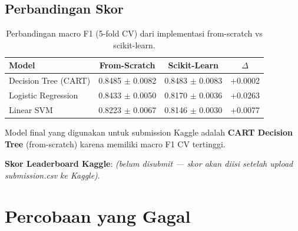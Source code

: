 \documentclass[12pt,a4paper]{article}
\begin{document}
\subsection{Perbandingan Skor}

\begin{table}[H]
\centering
\caption{Perbandingan macro F1 (5-fold CV) dari implementasi from-scratch vs scikit-learn.}
\label{tab:comparison}
\renewcommand{\arraystretch}{1.3}
\begin{tabular}{lccc}
\toprule
\textbf{Model} & \textbf{From-Scratch} & \textbf{Scikit-Learn} & \textbf{$\Delta$} \\
\midrule
Decision Tree (CART) & 0.8485 $\pm$ 0.0082 & 0.8483 $\pm$ 0.0083 & +0.0002 \\
Logistic Regression  & 0.8433 $\pm$ 0.0050 & 0.8170 $\pm$ 0.0036 & +0.0263 \\
Linear SVM           & 0.8223 $\pm$ 0.0067 & 0.8146 $\pm$ 0.0030 & +0.0077 \\
\bottomrule
\end{tabular}
\end{table}

Model final yang digunakan untuk submission Kaggle adalah \textbf{CART Decision Tree} (from-scratch) karena memiliki macro F1 CV tertinggi.

\textbf{Skor Leaderboard Kaggle}: \textit{(belum disubmit --- skor akan diisi setelah upload submission.csv ke Kaggle)}.

\section{Percobaan yang Gagal}
\label{sec:failed}
\end{document}
